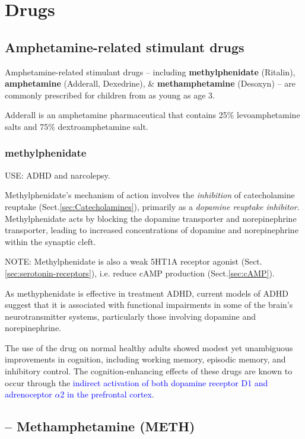\chapter{Drugs}
\label{chap:Drugs}

\section{Amphetamine-related stimulant drugs}


Amphetamine-related stimulant drugs -- including {\bf methylphenidate}
(Ritalin), {\bf amphetamine} (Adderall, Dexedrine), \& {\bf methamphetamine}
(Desoxyn) -- are commonly prescribed for children from as young as age 3.

Adderall is an amphetamine pharmaceutical that contains 25\% levoamphetamine
salts and 75\% dextroamphetamine salt.


\subsection{methylphenidate}
\label{sec:methylphenidate}

USE: ADHD and narcolepsy.

Methylphenidate's mechanism of action involves the {\it inhibition} of
catecholamine reuptake (Sect.\ref{sec:Catecholamines}), primarily as a {\it
dopamine reuptake inhibitor}.
Methylphenidate acts by blocking the dopamine transporter and norepinephrine
transporter, leading to increased concentrations of dopamine and norepinephrine
within the synaptic cleft.

NOTE: Methylphenidate is also a weak 5HT1A receptor agonist
(Sect.\ref{sec:serotonin-receptors}), i.e. reduce cAMP production
(Sect.\ref{sec:cAMP}).


As methyphenidate is effective in treatment ADHD, current models of ADHD
suggest that it is associated with functional impairments in some of the brain's
neurotransmitter systems, particularly those involving dopamine and
norepinephrine.

The use of the drug on normal healthy adults showed modest yet unambiguous
improvements in cognition, including working memory, episodic memory, and
inhibitory control. The cognition-enhancing effects of these drugs are known to
occur through the \textcolor{blue}{indirect activation of both dopamine receptor
D1 and adrenoceptor $\alpha$2 in the prefrontal cortex}.


\section{-- Methamphetamine (METH)}
\label{sec:methamphetamine}

